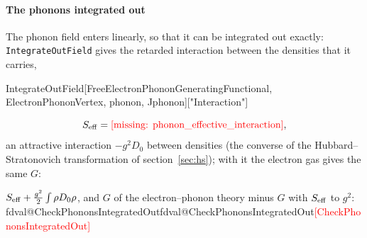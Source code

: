\documentclass[11pt,a4paper]{article}
\makeatletter
\newcommand{\formula}[1]{\IfFileExists{figures/formula_#1.tex}{}{\text{\textcolor{red}{[missing: \detokenize{#1}]}}}}
\newcommand{\pkg}[1]{\texttt{#1}}
\newcommand{\val}[1]{\ifcsname fdval@#1\endcsname\csname fdval@#1\endcsname\else\textcolor{red}{[#1]}\fi}
\makeatother
\begin{document}
\paragraph{The phonons integrated out} The phonon field enters linearly, so that it can be integrated out exactly:
\pkg{IntegrateOutField} gives the retarded interaction between the densities that it carries,
\begin{code}
IntegrateOutField[{FreeElectronPhononGeneratingFunctional, ElectronPhononVertex},
    phonon, Jphonon]["Interaction"]
\end{code}
\[
S_{\rm eff}=\formula{phonon_effective_interaction},
\]
an attractive interaction $-g^2D_0$ between densities (the converse of the Hubbard--Stratonovich transformation of
section~\ref{sec:hs}); with it the electron gas gives the same $G$:
\begin{result}
$S_{\rm eff}+\frac{g^2}2\int\rho D_0\rho$, and $G$ of the electron--phonon theory minus $G$ with $S_{\rm eff}$ to $g^2$:
\val{CheckPhononsIntegratedOut}
\end{result}
\end{document}
